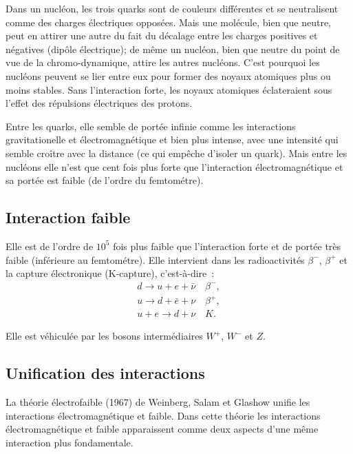 Dans un nucléon, les trois quarks sont de couleurs différentes et se neutralisent comme des charges électriques opposées. Mais une molécule, bien que neutre, peut en attirer une autre du fait du décalage entre les charges positives et négatives (dipôle électrique); de même un nucléon, bien que neutre du point de vue de la chromo-dynamique, attire les autres nucléons. C'est pourquoi les nucléons peuvent se lier entre eux pour former des noyaux atomiques plus ou moins stables.
Sans l'interaction forte, les noyaux atomiques éclateraient sous l'effet des répulsions électriques des protons.

Entre les quarks, elle semble de portée infinie comme les interactions gravitationelle et électromagnétique et bien plus intense, avec une intensité qui semble croître avec la distance (ce qui empêche d'isoler un quark). Mais entre les nucléons elle n'est que cent fois plus forte que l'interaction électromagnétique et sa portée est faible (de l'ordre du femtométre).

\subsection{Interaction faible}
\label{chap2-subsec:interactionfaible}

Elle est de l'ordre de $10^5$ fois plus faible que l'interaction forte et de portée très faible (inférieure au femtométre). Elle intervient dans les radioactivités $\beta^-$, $\beta^+$ et la capture électronique (K-capture), c'est-à-dire~:
\begin{align}
  d \rightarrow u + e + \bar{\nu} \quad \beta^{-}, \\
  u \rightarrow d + \bar{e} + \nu \quad \beta^{+}, \\
  u+e \rightarrow d + \nu \quad  K.
\end{align}

Elle est véhiculée par les bosons intermédiaires $W^+$, $W^-$ et $Z$.

\subsection{Unification des interactions}
\label{chap2-subsec:unification}

La théorie électrofaible (1967) de Weinberg, Salam et Glashow unifie les interactions électromagnétique et faible. Dans cette théorie les interactions électromagnétique et faible apparaissent comme deux aspects d'une même interaction plus fondamentale.

